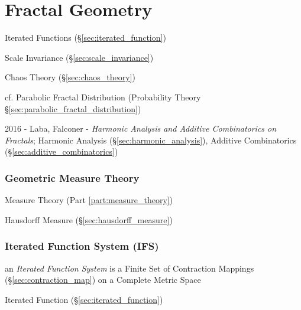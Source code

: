 \part{Fractal Geometry}\label{sec:fractal_geometry}

Iterated Functions (\S\ref{sec:iterated_function})

Scale Invariance (\S\ref{sec:scale_invariance})

Chaos Theory (\S\ref{sec:chaos_theory})

cf. Parabolic Fractal Distribution (Probability Theory
\S\ref{sec:parabolic_fractal_distribution})

2016 - Laba, Falconer - \emph{Harmonic Analysis and Additive Combinatorics on
  Fractals}; Harmonic Analysis (\S\ref{sec:harmonic_analysis}), Additive
Combinatorics (\S\ref{sec:additive_combinatorics})



\section{Geometric Measure Theory}\label{sec:geometric_measure_theory}

\fist Measure Theory (Part \ref{part:measure_theory})

\fist Hausdorff Measure (\S\ref{sec:hausdorff_measure})



\section{Iterated Function System (IFS)}\label{sec:ifs}

an \emph{Iterated Function System} is a Finite Set of Contraction Mappings
(\S\ref{sec:contraction_map}) on a Complete Metric Space

Iterated Function (\S\ref{sec:iterated_function})

